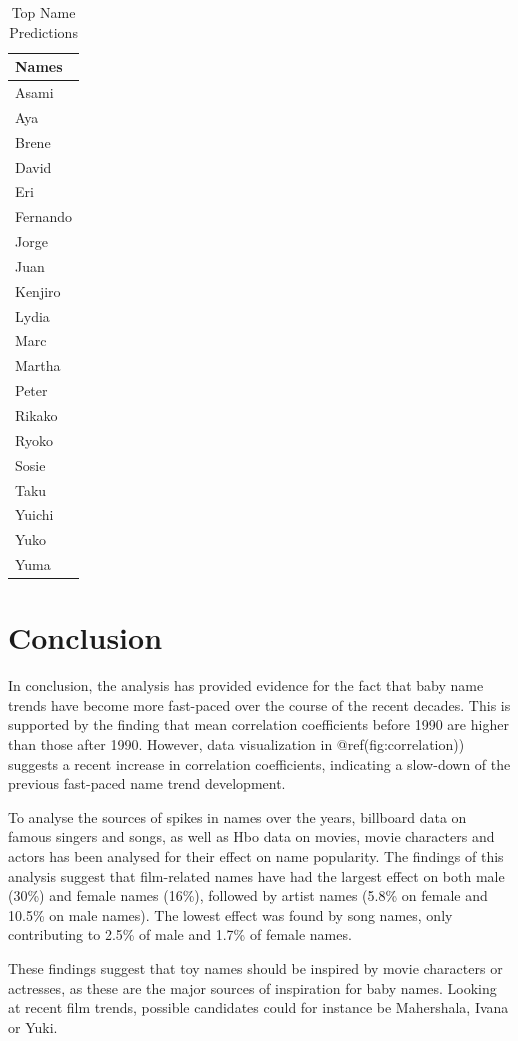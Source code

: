 \documentclass[11pt,preprint]{elsarticle}
\numberwithin{equation}{section}
\numberwithin{figure}{section}
\numberwithin{table}{section}
\begin{document}
\begin{longtable}[t]{l}
\caption{\label{tab:recommendations}Top Name Predictions}\\
\toprule
Names\\
\midrule
Asami\\
Aya\\
Brene\\
David\\
Eri\\
\addlinespace
Fernando\\
Jorge\\
Juan\\
Kenjiro\\
Lydia\\
\addlinespace
Marc\\
Martha\\
Peter\\
Rikako\\
Ryoko\\
\addlinespace
Sosie\\
Taku\\
Yuichi\\
Yuko\\
Yuma\\
\bottomrule
\end{longtable}

\section{Conclusion}\label{conclusion}

In conclusion, the analysis has provided evidence for the fact that baby
name trends have become more fast-paced over the course of the recent
decades. This is supported by the finding that mean correlation
coefficients before 1990 are higher than those after 1990. However, data
visualization in @ref(fig:correlation)) suggests a recent increase in
correlation coefficients, indicating a slow-down of the previous
fast-paced name trend development.

To analyse the sources of spikes in names over the years, billboard data
on famous singers and songs, as well as Hbo data on movies, movie
characters and actors has been analysed for their effect on name
popularity. The findings of this analysis suggest that film-related
names have had the largest effect on both male (30\%) and female names
(16\%), followed by artist names (5.8\% on female and 10.5\% on male
names). The lowest effect was found by song names, only contributing to
2.5\% of male and 1.7\% of female names.

These findings suggest that toy names should be inspired by movie
characters or actresses, as these are the major sources of inspiration
for baby names. Looking at recent film trends, possible candidates could
for instance be Mahershala, Ivana or Yuki.

\newpage


\end{document}
